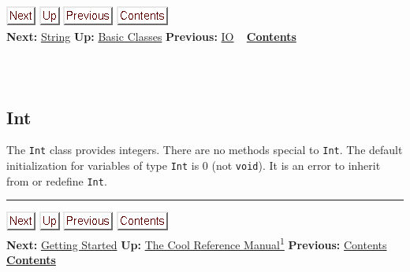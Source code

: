 \documentclass[]{article}
\begin{document}
\href{node30.html}{\includegraphics{next.png}}
\href{node26.html}{\includegraphics{up.png}}
\href{node28.html}{\includegraphics{prev.png}}
\href{node1.html}{\includegraphics{contents.png}} \\ \textbf{Next:}
\href{node30.html}{String} \textbf{Up:} \href{node26.html}{Basic
Classes} \textbf{Previous:} \href{node28.html}{IO} ~
\textbf{\href{node1.html}{Contents}} \\ \\

\subsection{\\ Int}

The \texttt{Int} class provides integers. There are no methods special
to \texttt{Int}. The default initialization for variables of type
\texttt{Int} is 0 (not \texttt{void}). It is an error to inherit from or
redefine \texttt{Int}.

\begin{center}\rule{3in}{0.4pt}\end{center}

\href{node3.html}{\includegraphics{next.png}}
\href{cool-manual.html}{\includegraphics{up.png}}
\href{node1.html}{\includegraphics{prev.png}}
\href{node1.html}{\includegraphics{contents.png}} \\ \textbf{Next:}
\href{node3.html}{Getting Started} \textbf{Up:}
\href{cool-manual.html}{The Cool Reference Manual\textsuperscript{1}}
\textbf{Previous:} \href{node1.html}{Contents} ~
\textbf{\href{node1.html}{Contents}} \\ \\
\end{document}
